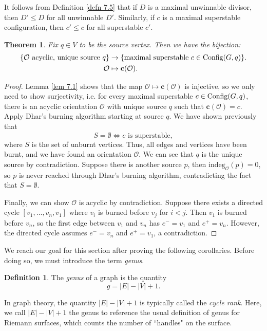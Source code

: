 \documentclass[openany, amssymb, psamsfonts]{amsart}
\newtheorem{thm}{Theorem}[section]
\theoremstyle{definition}
\newtheorem{defn}{Definition}[section]
\numberwithin{equation}{section}
\begin{document}
It follows from Definition \ref{defn 7.5} that if $D$ is a maximal unwinnable divisor, then $D'\leq D$ for all unwinnable $D'$. Similarly, if $c$ is a maximal superstable configuration, then $c'\leq c$ for all superstable $c'$.

\begin{thm}
\label{thm 7.1}
Fix $q\in V$ to be the source vertex. Then we have the bijection:
\begin{align*}
    \{\mathcal{O}\text{ acyclic, unique source $q$}\} &\rightarrow \{\text{maximal superstable }c\in \textup{Config}(G,q)\}.\\
    \mathcal{O}&\mapsto \textbf{c}(\mathcal{O}).
\end{align*}
\end{thm}
\begin{proof}
Lemma \ref{lem 7.1} shows that the map $\mathcal{O}\mapsto \textbf{c}(\mathcal{O})$ is injective, so we only need to show surjectivity, i.e. for every maximal superstable $c\in \textup{Config}(G,q)$, there is an acyclic orientation $\mathcal{O}$ with unique source $q$ such that $\textbf{c}(\mathcal{O})=c$. Apply Dhar's burning algorithm starting at source $q$. We have shown previously that
\[S=\emptyset \Longleftrightarrow c \text{ is superstable},\]
where $S$ is the set of unburnt vertices. Thus, all edges and vertices have been burnt, and we have found an orientation $\mathcal{O}$. We can see that $q$ is the unique source by contradiction. Suppose there is another source $p$, then $\text{indeg}_{\mathcal{O}}(p)=0$, so $p$ is never reached through Dhar's burning algorithm, contradicting the fact that $S=\emptyset$.

Finally, we can show $\mathcal{O}$ is acyclic by contradiction. Suppose there exists a directed cycle $[v_1,\dots,v_n,v_1]$ where $v_i$ is burned before $v_j$ for $i<j$. Then $v_1$ is burned before $v_n$, so the first edge between $v_1$ and $v_n$ has $e^-=v_1$ and $e^+=v_n$. However, the directed cycle assumes $e^-=v_n$ and $e^+=v_1$, a contradiction.
\end{proof}

We reach our goal for this section after proving the following corollaries. Before doing so, we must introduce the term \textit{genus}.

\begin{defn}
\label{defn 7.6}
The \textit{genus} of a graph is the quantity
\[g=|E|-|V|+1.\]
\end{defn}

In graph theory, the quantity $|E|-|V|+1$ is typically called the \textit{cycle rank}. Here, we call $|E|-|V|+1$ the genus to reference the usual definition of genus for Riemann surfaces, which counts the number of ``handles" on the surface.
\end{document}
